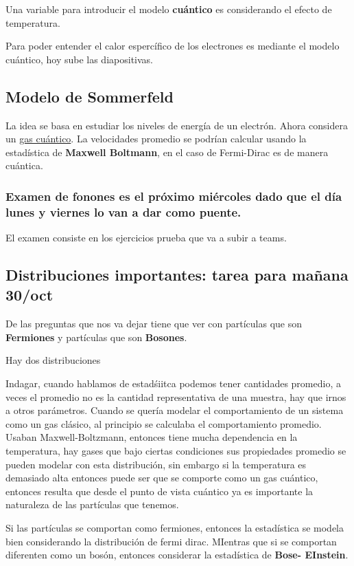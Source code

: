\documentclass{article}
\begin{document}
Una variable para introducir el modelo \textbf{cuántico} es considerando el efecto de temperatura. 

Para poder entender el calor espercífico de los electrones es mediante el modelo cuántico, hoy sube las diapositivas. 

\subsection{Modelo de Sommerfeld}


La idea se basa en estudiar los niveles de energía de un electrón. Ahora considera un \underline{gas cuántico}. La velocidades promedio se podrían calcular usando la estadística de \textbf{Maxwell Boltmann}, en el caso de Fermi-Dirac es de manera cuántica. 



\subsubsection{Examen de fonones es el próximo miércoles dado que el día lunes y viernes lo van a dar como puente.}

El examen consiste en los ejercicios prueba que va a subir a teams. 


\subsection{Distribuciones importantes: tarea para mañana 30/oct}

De las preguntas que nos va dejar tiene que ver con partículas que son \textbf{Fermiones} y partículas que son \textbf{Bosones}. 

Hay dos distribuciones

Indagar, cuando hablamos de estadśiitca podemos tener cantidades promedio, a veces el promedio no es la cantidad representativa de una muestra, hay que irnos a otros parámetros. Cuando se quería modelar el comportamiento de un sistema como un gas clásico, al principio se calculaba el comportamiento promedio. Usaban Maxwell-Boltzmann, entonces tiene mucha dependencia en la temperatura, hay gases que bajo ciertas condiciones sus propiedades promedio se pueden modelar con esta distribución, sin embargo si la temperatura es demasiado alta entonces puede ser que se comporte como un gas cuántico, entonces resulta que desde el punto de vista cuántico ya es importante la naturaleza de las partículas que tenemos.


Si las partículas se comportan como fermiones, entonces la estadística se modela bien considerando la distribución de fermi dirac. MIentras que si se comportan diferenten como un bosón, entonces considerar la estadística de \textbf{Bose- EInstein}.
\end{document}

